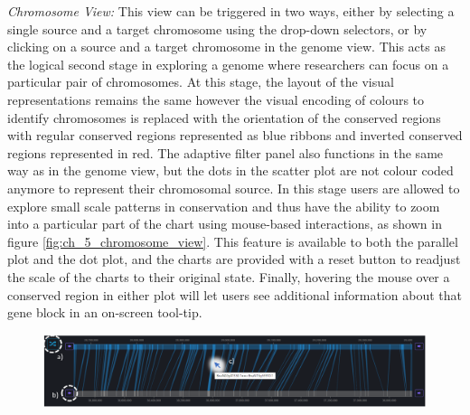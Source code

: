 \textit{Chromosome View:} This view can be triggered in two ways, either by selecting a single source and a target chromosome using the drop-down selectors, or by clicking on a source and a target chromosome in the genome view. This acts as the logical second stage in exploring a genome where researchers can focus on a particular pair of chromosomes. At this stage, the layout of the visual representations remains the same however the visual encoding of colours to identify chromosomes is replaced with the orientation of the conserved regions with regular conserved regions represented as blue ribbons and inverted conserved regions represented in red. The adaptive filter panel also functions in the same way as in the genome view, but the dots in the scatter plot are not colour coded anymore to represent their chromosomal source. In this stage users are allowed to explore small scale patterns in conservation and thus have the ability to zoom into a particular part of the chart using mouse-based interactions, as shown in figure \ref{fig:ch_5_chromosome_view}. This feature is available to both the parallel plot and the dot plot, and the charts are provided with a reset button to readjust the scale of the charts to their original state. Finally, hovering the mouse over a conserved region in either plot will let users see additional information about that gene block in an on-screen tool-tip.



\begin{figure}[h]
  \centering
  \includegraphics[width=1\linewidth]{images/ch_5_block_view.PNG}
  \label{fig:ch_5_block_view}
\end{figure} 

